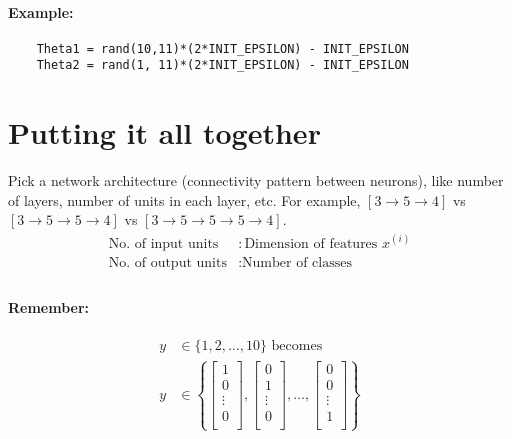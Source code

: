 \paragraph{Example:}
\begin{verbatim}
	Theta1 = rand(10,11)*(2*INIT_EPSILON) - INIT_EPSILON
	Theta2 = rand(1, 11)*(2*INIT_EPSILON) - INIT_EPSILON
\end{verbatim}

\section{Putting it all together}
Pick a network architecture (connectivity pattern between neurons), like number of
layers, number of units in each layer, etc. For example, $[3 \rightarrow 5 \rightarrow 4]$
vs $[3 \rightarrow 5 \rightarrow 5 \rightarrow 4]$ vs $[3 \rightarrow 5 \rightarrow 5
			\rightarrow 5 \rightarrow 4]$.
\begin{align*}
	\text{No. of input units}  & : \text{Dimension of features } x^{(i)} \\
	\text{No. of output units} & : \text{Number of classes}              \\
\end{align*}
\paragraph{Remember:}
\begin{align*}
	y & \in \{1, 2, \dots, 10\}	\text{ becomes } \\
	y & \in \left\{
	\begin{bmatrix}
		1      \\
		0      \\
		\vdots \\
		0      \\
	\end{bmatrix},
	\begin{bmatrix}
		0      \\
		1      \\
		\vdots \\
		0      \\
	\end{bmatrix}, \dots,
	\begin{bmatrix}
		0      \\
		0      \\
		\vdots \\
		1      \\
	\end{bmatrix}
	\right\}
\end{align*}

